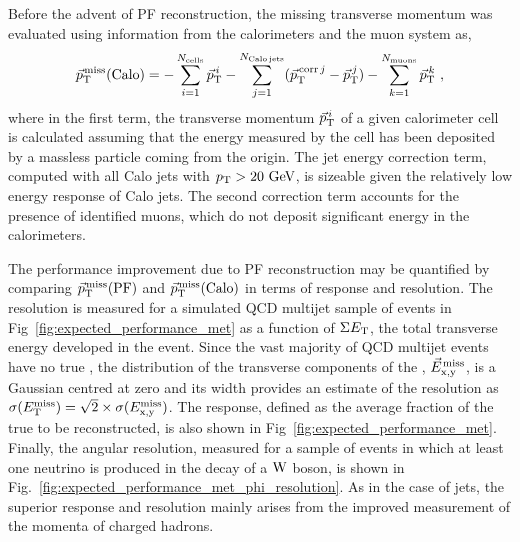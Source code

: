 Before the advent of PF reconstruction, the missing transverse
momentum was evaluated using information from the calorimeters and the
muon system as,
\begin{equation}
  {\vec p}_{\mathrm{T}}^{\kern1pt\text{miss}} ({\mathrm{Calo}}) = - \sum_{i=1}^{N_{\mathrm{cells}}}
  {\vec p}_{\mathrm{T}}^{\,i} - \sum_{j=1}^{N_{\mathrm{Calo\,jets}}} ({\vec p^{\,\mathrm{corr}\,j}_{\mathrm T}} - {\vec p}_{\mathrm{T}}^{\,j}) - \sum_{k=1}^{N_{\mathrm{muons}}} {\vec p}_{\mathrm{T}}^{\,k}~,
\end{equation}
where in the first term, the transverse momentum ${\vec p}_{\mathrm{T}}^{\,i}$ of a
given calorimeter cell is calculated assuming that the energy
measured by the cell has been deposited by a massless particle coming
from the origin. The jet energy correction term, computed with all
Calo jets with $p_{\mathrm{T}}>20\,\,\text{Ge\hspace{-.08em}V}$, is sizeable given the relatively low energy response
of Calo jets. The second correction term accounts for the presence of
identified muons, which do not deposit significant energy in the calorimeters.

The performance improvement due to PF reconstruction may be
quantified by comparing ${\vec p}_{\mathrm{T}}^{\kern1pt\text{miss}}(\mathrm{PF})$ and
${\vec p}_{\mathrm{T}}^{\kern1pt\text{miss}}(\mathrm{Calo})$ in terms of \MET response and
resolution. The \MET resolution is measured for a simulated QCD
multijet sample of events in Fig~\ref{fig:expected_performance_met} as a function of $\Sigma E_\textrm{T}$, the total
transverse energy developed in the event. Since the vast majority of
QCD multijet events have no true \MET, the distribution of the
transverse components of the \vecMET, $\vec{E}_\textrm{x,y}^\textrm{\kern0.10em miss}$, is a Gaussian centred at
zero and its width provides an estimate of the \MET resolution as $\sigma(E_{\mathrm{T}}^{\text{miss}})=\sqrt{2} \times
\sigma(E_\textrm{x,y}^\textrm{miss})$. The \sumET response, defined as the average fraction of the true \sumET to
be reconstructed, is also shown in Fig~\ref{fig:expected_performance_met}. Finally, the \vecMET
angular resolution, measured for a sample of \ttbar events in which at
least one neutrino is produced in the decay of a $\mathrm{W}$ boson, is shown
in Fig.~\ref{fig:expected_performance_met_phi_resolution}.  As in
the case of jets, the superior response and resolution mainly arises
from the improved measurement of the momenta of charged hadrons.


